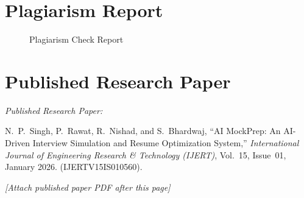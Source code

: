 \documentclass[12pt,a4paper,oneside]{report}
\begin{document}
\appendix






\chapter{Plagiarism Report}
\label{app:plagiarism}

\begin{figure}[H]
\centering
{}
\caption{Plagiarism Check Report}
\label{fig:plagiarism}
\end{figure}


\chapter{Published Research Paper}
\label{app:paper}

\textit{Published Research Paper:}

N.~P.~Singh, P.~Rawat, R.~Nishad, and S.~Bhardwaj, ``AI MockPrep: An AI-Driven Interview Simulation and Resume Optimization System,'' \textit{International Journal of Engineering Research \& Technology (IJERT)}, Vol.~15, Issue~01, January 2026. (IJERTV15IS010560).

\vspace{1cm}
\textit{[Attach published paper PDF after this page]}
\end{document}
